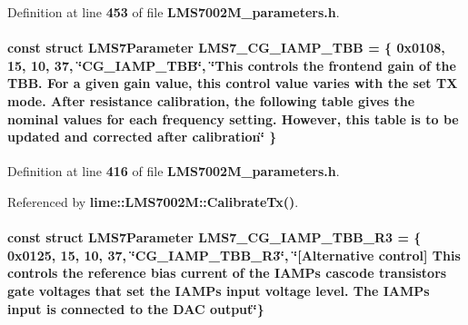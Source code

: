 Definition at line {\bf 453} of file {\bf L\+M\+S7002\+M\+\_\+parameters.\+h}.

\paragraph[{L\+M\+S7\+\_\+\+C\+G\+\_\+\+I\+A\+M\+P\+\_\+\+T\+BB}]{\setlength{\rightskip}{0pt plus 5cm}const struct {\bf L\+M\+S7\+Parameter} L\+M\+S7\+\_\+\+C\+G\+\_\+\+I\+A\+M\+P\+\_\+\+T\+BB = \{ 0x0108, 15, 10, 37, \char`\"{}\+C\+G\+\_\+\+I\+A\+M\+P\+\_\+\+T\+B\+B\char`\"{}, \char`\"{}\+This controls the frontend gain of the T\+B\+B. For a given gain value, this control value varies with the set T\+X mode. After resistance calibration, the following table gives the nominal values for each frequency setting. However, this table is to be updated and corrected after calibration\char`\"{} \}\hspace{0.3cm}{\ttfamily [static]}}\label{LMS7002M__parameters_8h_a9b6fba9a6953c705bb23b7967c8ac1a6}


Definition at line {\bf 416} of file {\bf L\+M\+S7002\+M\+\_\+parameters.\+h}.



Referenced by {\bf lime\+::\+L\+M\+S7002\+M\+::\+Calibrate\+Tx()}.

\paragraph[{L\+M\+S7\+\_\+\+C\+G\+\_\+\+I\+A\+M\+P\+\_\+\+T\+B\+B\+\_\+\+R3}]{\setlength{\rightskip}{0pt plus 5cm}const struct {\bf L\+M\+S7\+Parameter} L\+M\+S7\+\_\+\+C\+G\+\_\+\+I\+A\+M\+P\+\_\+\+T\+B\+B\+\_\+\+R3 = \{ 0x0125, 15, 10, 37, \char`\"{}\+C\+G\+\_\+\+I\+A\+M\+P\+\_\+\+T\+B\+B\+\_\+\+R3\char`\"{}, \char`\"{}[\+Alternative control] This controls the reference bias current of the I\+A\+M\+P\textquotesingle{}s cascode transistors gate voltages that set the I\+A\+M\+P\textquotesingle{}s input voltage level. The I\+A\+M\+P\textquotesingle{}s input is connected to the D\+A\+C output\char`\"{}\}\hspace{0.3cm}{\ttfamily [static]}}\label{LMS7002M__parameters_8h_a91d2b8dab95be0ab3c42fa410db7477a}



